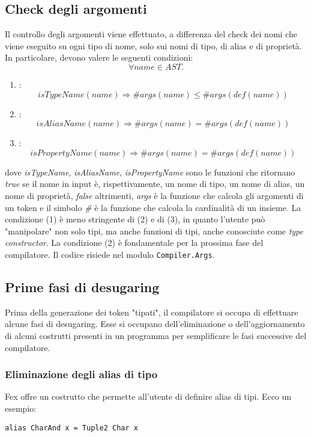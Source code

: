 \documentclass[10pt,a4paper]{article}
\begin{document}
\subsection{Check degli argomenti}
Il controllo degli argomenti viene effettuato, a differenza del check dei nomi che viene eseguito su ogni tipo di nome,
solo sui nomi di tipo, di alias e di proprietà. In particolare, devono valere le seguenti condizioni:
\[ \forall name \in AST. \]
\begin{enumerate}
    \item:
        \[ isTypeName(name) \Longrightarrow \# args(name) \leq \#args(def(name)) \]
    \item:
        \[ isAliasName(name) \Longrightarrow \#args(name) = \#args(def(name)) \]
    \item:
        \[ isPropertyName(name) \Longrightarrow \#args(name) = \#args(def(name)) \]
\end{enumerate}
dove \textit{isTypeName}, \textit{isAliasName}, \textit{isPropertyName} sono le funzioni che ritornano \textit{true}
se il nome in input è, rispettivamente, un nome di tipo, un nome di alias, un nome di proprietà, \textit{false} altrimenti,
\textit{args} è la funzione che calcola gli argomenti di un token e il simbolo \textit{\#} è la funzione che calcola
la cardinalità di un insieme. La condizione (1) è meno stringente di (2) e di (3),
in quanto l'utente può "manipolare" non solo tipi, ma anche funzioni di tipi,
anche conosciute come \textit{type constructor}. La condizione (2) è fondamentale per la prossima fase del compilatore.
Il codice risiede nel modulo \texttt{Compiler.Args}.

\subsection{Prime fasi di desugaring}
Prima della generazione dei token "tipati", il compilatore si occupa di effettuare alcune fasi di desugaring. Esse si
occupano dell'eliminazione o dell'aggiornamento di alcuni costrutti presenti in un programma per semplificare le fasi
successive del compilatore.

\subsubsection{Eliminazione degli alias di tipo}
Fex offre un costrutto che permette all'utente di definire alias di tipi. Ecco un esempio:

\begin{lstlisting}
alias CharAnd x = Tuple2 Char x
\end{lstlisting}
\end{document}
